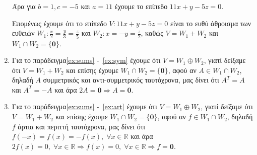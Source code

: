 \begin{examples}
\begin{enumerate}
            Άρα για $ b=1, c=-5 $ και $ a=11 $ έχουμε το επίπεδο $ 11x+y-5z=0 $.

            Επομένως έχουμε ότι το επίπεδο $ V: 11x+y-5z=0 $ είναι το 
            ευθύ άθροισμα των ευθειών $ W_{1}: \frac{x}{2} = \frac{y}{3} = 
            \frac{z}{5}$ και $ W_{2}: x=-y= \frac{z}{2} $, καθώς 
            $ V = W_{1}+W_{2} $ και $ W_{1}\cap W_{2} = \{ \mathbf{0} \} $.

        \item Για το παράδειγμα\ref{ex:sums} -~\ref{ex:sym} έχουμε ότι 
            $ V = W_{1} \oplus W_{2} $, 
            γιατί δείξαμε ότι $ V= W_{1}+W_{2} $ και επίσης έχουμε 
            $ W_{1} \cap W_{2} = \{ \mathbf{0} \} $, 
            αφού αν $A \in W_{1} \cap W_{2}$, δηλαδή $ A $ συμμετρικός και 
            αντι-συμμετρικός ταυτόχρονα, μας δίνει ότι $ A^{T} = A $ και 
            $ A^{T}=-A $ και άρα $ 2A = \mathbf{0} \Rightarrow A= \mathbf{0} $.

        \item Για το παράδειγμα\ref{ex:sums} -~\ref{ex:art} έχουμε ότι 
            $ V = W_{1} \oplus W_{2} $, 
            γιατί δείξαμε ότι $ V= W_{1}+W_{2} $ και επίσης έχουμε 
            $ W_{1} \cap W_{2} = \{ \mathbf{0} \} $, 
            αφού αν $f \in W_{1} \cap W_{2}$, δηλαδή $ f $ άρτια και περιττή 
            ταυτόχρονα, μας δίνει ότι $ f(-x)=f(x)=-f(x), \; \forall x \in 
            \mathbb{R} $ και άρα $ 2f(x) = 0, \; \forall x \in 
            \mathbb{R} \Rightarrow f(x)=0, \; \forall x \in \mathbb{R} 
            \Rightarrow f = \mathbf{0} $.
    \end{enumerate}
\end{examples}



